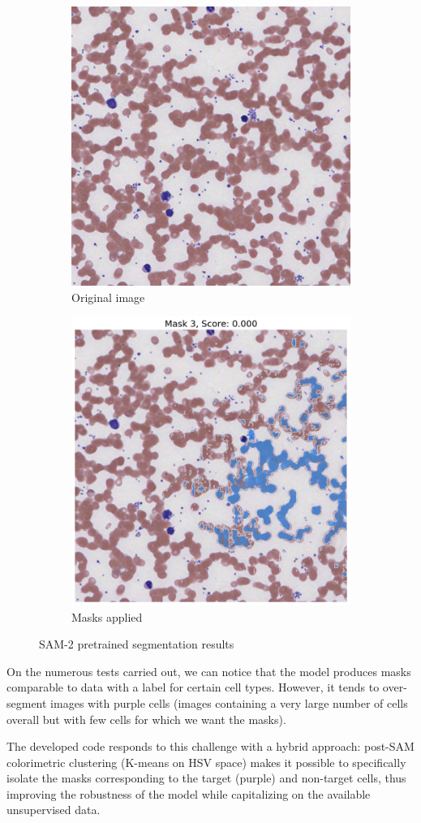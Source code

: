 \documentclass[]{article}
\begin{document}
\begin{figure}[H]
    \centering
    \begin{subfigure}[b]{0.45\textwidth}
        \centering
        \includegraphics[width=0.45\linewidth]{reports/images/cell_00225.png}
        \caption{Original image}
    \end{subfigure}
    \hfill
    \begin{subfigure}[b]{0.45\textwidth}
        \centering
        \includegraphics[width=0.45\linewidth]{reports/images/sam2_pretrain_results.png}
        \caption{Masks applied}
    \end{subfigure}
    \caption{SAM-2 pretrained segmentation results}
    \label{fig:transformed_images}
\end{figure}

On the numerous tests carried out, we can notice that the model produces masks comparable to data with a label for certain cell types. However, it tends to over-segment images with purple cells (images containing a very large number of cells overall but with few cells for which we want the masks).

The developed code responds to this challenge with a hybrid approach: post-SAM colorimetric clustering (K-means on HSV space) makes it possible to specifically isolate the masks corresponding to the target (purple) and non-target cells, thus improving the robustness of the model while capitalizing on the available unsupervised data.
\end{document}
